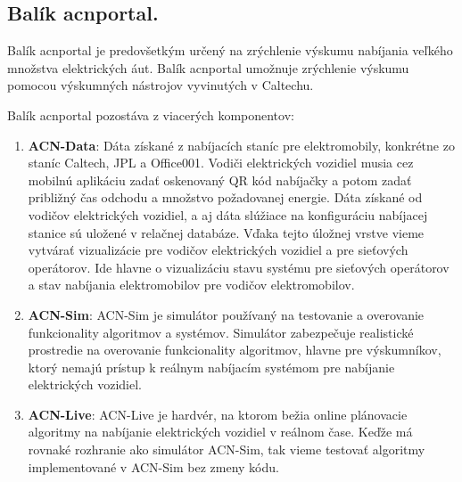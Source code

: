 
\subsection{Balík acnportal.}
\label{technolgie:acnportal}

Balík acnportal je predovšetkým určený na zrýchlenie výskumu nabíjania veľkého množstva elektrických áut. Balík acnportal umožnuje zrýchlenie výskumu pomocou výskumných nástrojov vyvinutých v Caltechu. 
 
 Balík acnportal pozostáva z viacerých komponentov:

\begin{enumerate}
    \item \textbf{ACN-Data}: Dáta získané z nabíjacích staníc pre elektromobily, konkrétne zo staníc Caltech, JPL a Office001. 
    Vodiči elektrických vozidiel musia cez mobilnú aplikáciu zadať oskenovaný QR kód nabíjačky a potom zadať približný čas odchodu a množstvo požadovanej energie. 
    Dáta získané od vodičov elektrických vozidiel, a aj dáta slúžiace na konfiguráciu nabíjacej stanice sú uložené v relačnej databáze. 
    Vďaka tejto úložnej vrstve vieme vytvárať vizualizácie pre vodičov elektrických vozidiel a pre sieťových operátorov. 
    Ide hlavne o vizualizáciu stavu systému pre sieťových operátorov a stav nabíjania elektromobilov pre vodičov elektromobilov.
    \item \textbf{ACN-Sim}: ACN-Sim je simulátor používaný na testovanie a overovanie funkcionality algoritmov a systémov. Simulátor zabezpečuje realistické prostredie na overovanie funkcionality algoritmov, hlavne pre výskumníkov, ktorý nemajú prístup k reálnym nabíjacím systémom pre nabíjanie elektrických vozidiel.
    \item \textbf{ACN-Live}: ACN-Live je hardvér, na ktorom bežia online plánovacie algoritmy na nabíjanie elektrických vozidiel v reálnom čase. Keďže má rovnaké rozhranie ako simulátor ACN-Sim, tak vieme testovať algoritmy implementované v ACN-Sim bez zmeny kódu. \cite{lee2021acnsim, lee2020adaptive}
\end{enumerate}

